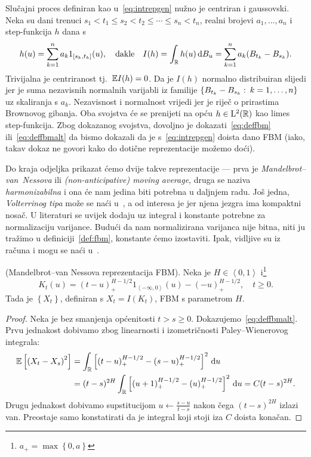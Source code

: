 \documentclass[main.tex]{subfiles}
\begin{document}
Slučajni proces definiran kao u~\eqref{eq:intrepgen} nužno je centriran
i gaussovski. Neka su dani trenuci \( s_1 < t_1 \le s_2 < t_2 \le \cdots \le s_n < t_n \),
realni brojevi \( a_1, \ldots, a_n \) i step-funkcija \( h \) dana s
\[
	h(u) = \sum_{k=1}^n a_k 1_{\left[ s_k, t_k \right]}(u), \quad
	\text{dakle} \quad
	I(h) = \int_{\mathbb{R}} h(u) \,\mathrm d B_u
	= \sum_{k=1}^n a_k(B_{t_k}-B_{s_k}).
\]
Trivijalna je centriranost tj.\ \( \mathbb{E} I(h) = 0 \). Da je
\( I(h) \) normalno distribuiran slijedi jer je suma nezavisnih
normalnih varijabli iz familije
\(
\left\{ B_{t_k} - B_{s_k} \, \colon \, k = 1, \ldots, n  \right\}
\)
uz skaliranja s \( a_k \). Nezavisnost i normalnost vrijedi
jer je riječ o prirastima Brownovog gibanja. Oba svojstva
će se prenijeti na opću \( h \in \mathrm{L}^2(\mathbb{R}) \) kao limes
step-funkcija. Zbog dokazanog svojstva, dovoljno je dokazati~\eqref{eq:deffbm}
ili~\eqref{eq:deffbmalt} da bismo dokazali da je s~\eqref{eq:intrepgen}
doista dano FBM (iako, takav dokaz ne govori kako do dotične reprezentacije možemo doći).

Do kraja odjeljka prikazat ćemo dvije takve reprezentacije ---
prva je \emph{Mandelbrot--van~Nessova} ili \emph{(non-anticipative) moving average},
druga se naziva \emph{harmonizabilna} i ona će nam jedina biti potrebna u daljnjem radu.
Još jedna, \emph{Volterrinog tipa} može se naći u~\cite{se}, a
od interesa je jer njena jezgra ima kompaktni nosač.
U literaturi se uvijek dodaju uz integral i konstante potrebne za normalizaciju varijance.
Budući da nam normalizirana varijanca nije bitna, niti ju tražimo
u definiciji~\ref{def:fbm}, konstante
ćemo izostaviti. Ipak, vidljive su iz računa i mogu se naći u~\cite{se}.

\begin{teorem} (Mandelbrot--van Nessova reprezentacija FBM).
	Neka je \( H \in \left\langle 0, 1 \right\rangle \) i\footnote{\( a_+=\max\left\{ 0,a \right\} \)}
	\begin{equation}
		K_t(u) =
		(t-u)_+^{H-1/2} 1_{\left\langle -\infty,0 \right\rangle}(u) - (-u)_+^{H-1/2}, \quad t \ge 0.
	\end{equation}
	Tada je \( \left\{ X_t \right\} \),
	definiran s \( X_t = I(K_t) \), FBM s parametrom \( H \).
\end{teorem}

\begin{proof}
	Neka je bez smanjenja općenitosti \( t > s \ge 0 \).
	Dokazujemo~\eqref{eq:deffbmalt}. Prvu jednakost
	dobivamo zbog linearnosti i izometričnosti Paley--Wienerovog integrala:
	\begin{align}
		\mathbb{E}\left[ \left( X_t-X_s \right)^2 \right]
		 & = \int_{\mathbb{R}} \left[ (t-u)_+^{H-1/2} - (s-u)_+^{H-1/2} \right]^2 \,\mathrm d u                          \\
		 & = (t-s)^{2H} \int_{\mathbb{R}} \left[ (u+1)_+^{H-1/2} - (u)_+^{H-1/2}  \right]^2 \,\mathrm d u = C(t-s)^{2H}.
	\end{align}
	Drugu jednakost dobivamo supstitucijom \( u \leftarrow \frac{s-u}{t-s} \)
	nakon čega \( (t-s)^{2H} \) izlazi van. Preostaje samo konstatirati da je
	integral koji stoji iza \( C \) doista konačan.
\end{proof}
\end{document}
